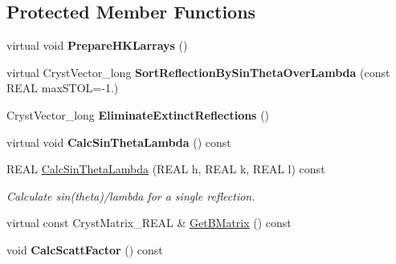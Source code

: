 \subsection*{Protected Member Functions}
\begin{DoxyCompactItemize}
\item 
\mbox{\label{class_obj_cryst_1_1_scattering_data_a52a2bf0d0ea5a112c771586fc8c1c9c9}} 
virtual void {\bfseries Prepare\+H\+K\+Larrays} ()
\item 
\mbox{\label{class_obj_cryst_1_1_scattering_data_aa0a07cea84be3d4fce2b438d3ddbcf73}} 
virtual Cryst\+Vector\+\_\+long {\bfseries Sort\+Reflection\+By\+Sin\+Theta\+Over\+Lambda} (const R\+E\+AL max\+S\+T\+OL=-\/1.)
\item 
\mbox{\label{class_obj_cryst_1_1_scattering_data_ac8cc7361579cd633ae295823a235813c}} 
Cryst\+Vector\+\_\+long {\bfseries Eliminate\+Extinct\+Reflections} ()
\item 
\mbox{\label{class_obj_cryst_1_1_scattering_data_a9ccfd7dbc848465b7f79620c0795a057}} 
virtual void {\bfseries Calc\+Sin\+Theta\+Lambda} () const
\item 
\mbox{\label{class_obj_cryst_1_1_scattering_data_ac91f02d10690ef50f519819aeec99b07}} 
R\+E\+AL \mbox{\hyperlink{class_obj_cryst_1_1_scattering_data_ac91f02d10690ef50f519819aeec99b07}{Calc\+Sin\+Theta\+Lambda}} (R\+E\+AL h, R\+E\+AL k, R\+E\+AL l) const
\begin{DoxyCompactList}\small\item\em Calculate sin(theta)/lambda for a single reflection. \end{DoxyCompactList}\item 
virtual const Cryst\+Matrix\+\_\+\+R\+E\+AL \& \mbox{\hyperlink{class_obj_cryst_1_1_scattering_data_abd28bb9c58ba25cc61cb138cab3df5de}{Get\+B\+Matrix}} () const
\item 
\mbox{\label{class_obj_cryst_1_1_scattering_data_a3924b7c2674c313a0d632c0c190ba148}} 
void {\bfseries Calc\+Scatt\+Factor} () const
\item 
\mbox{\label{class_obj_cryst_1_1_scattering_data_af1586acd9c69af79c01d2341dcfb8fa3}} 

\end{DoxyCompactItemize}

